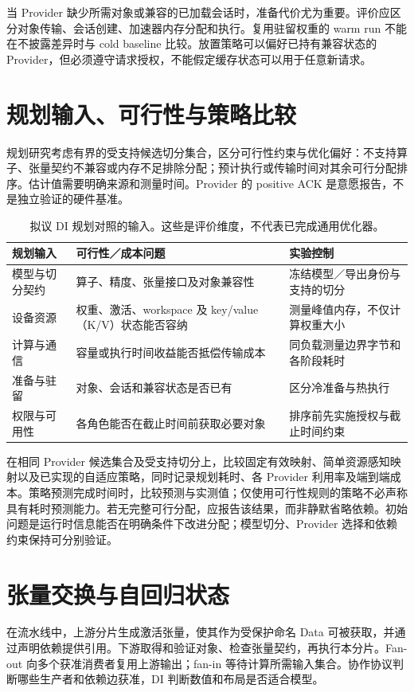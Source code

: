 当 Provider 缺少所需对象或兼容的已加载会话时，准备代价尤为重要。评价应区分对象传输、会话创建、加速器内存分配和执行。复用驻留权重的 warm run 不能在不披露差异时与 cold baseline 比较。放置策略可以偏好已持有兼容状态的 Provider，但必须遵守请求授权，不能假定缓存状态可以用于任意新请求。

\section{规划输入、可行性与策略比较}
规划研究考虑有界的受支持候选切分集合，区分可行性约束与优化偏好：不支持算子、张量契约不兼容或内存不足排除分配；预计执行或传输时间对其余可行分配排序。估计值需要明确来源和测量时间。Provider 的 positive ACK 是意愿报告，不是独立验证的硬件基准。

\begin{table}[htbp]\centering\small
\caption{拟议 DI 规划对照的输入。这些是评价维度，不代表已完成通用优化器。}
\begin{tabularx}{\textwidth}{p{}XX}
\toprule 规划输入 & 可行性／成本问题 & 实验控制\\\midrule
模型与切分契约 & 算子、精度、张量接口及对象兼容性 & 冻结模型／导出身份与支持的切分\\\midrule
设备资源 & 权重、激活、workspace 及 key/value（K/V）状态能否容纳 & 测量峰值内存，不仅计算权重大小\\\midrule
计算与通信 & 容量或执行时间收益能否抵偿传输成本 & 同负载测量边界字节和各阶段耗时\\\midrule
准备与驻留 & 对象、会话和兼容状态是否已有 & 区分冷准备与热执行\\\midrule
权限与可用性 & 各角色能否在截止时间前获取必要对象 & 排序前先实施授权与截止时间约束\\\bottomrule
\end{tabularx}\end{table}

在相同 Provider 候选集合及受支持切分上，比较固定有效映射、简单资源感知映射以及已实现的自适应策略，同时记录规划耗时、各 Provider 利用率及端到端成本。策略预测完成时间时，比较预测与实测值；仅使用可行性规则的策略不必声称具有耗时预测能力。若无完整可行分配，应报告该结果，而非静默省略依赖。初始问题是运行时信息能否在明确条件下改进分配；模型切分、Provider 选择和依赖约束保持可分别验证。

\section{张量交换与自回归状态}
在流水线中，上游分片生成激活张量，使其作为受保护命名 Data 可被获取，并通过声明依赖提供引用。下游取得和验证对象、检查张量契约，再执行本分片。Fan-out 向多个获准消费者复用上游输出；fan-in 等待计算所需输入集合。协作协议判断哪些生产者和依赖边获准，DI 判断数值和布局是否适合模型。

